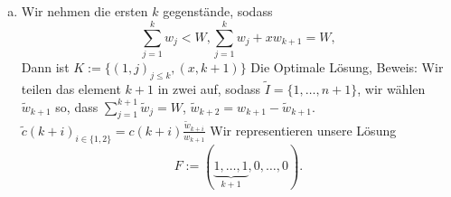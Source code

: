 \documentclass{article}
\begin{document}
    \maketitle
    \section{}
    \begin{enumerate}[a)]
        \item
            Wir nehmen die ersten $k$ gegenstände, sodass
            \begin{equation*}
                \sum_{j=1}^{k}w_j<W,
                \sum_{j=1}^{k}w_j+xw_{k+1}=W,
            \end{equation*}
            Dann ist $K:=\{(1, j)_{j\leq k}, (x, k+1)\}$ Die Optimale Lösung, Beweis:
            Wir teilen das element $k+1$ in zwei auf, sodass $\tilde{I}=\{1,\hdots,n+1\}$,
            wir wählen $\tilde{w}_{k+1}$ so, dass $\sum_{j=1}^{k+1}\tilde{w}_j=W$,
            $\tilde{w}_{k+2}=w_{k+1}-\tilde{w}_{k+1}$. $\tilde{c}(k+i)_{i\in\{1,2\}}=c(k+i)\frac{\tilde{w}_{k+i}}{w_{k+1}}$
            Wir representieren unsere Lösung
            \begin{equation*}
                F:=(\underbrace{1,\hdots,1}_{k+1},0,\hdots,0).
            \end{equation*}



\end{enumerate}
\end{document}
